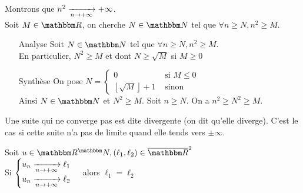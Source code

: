 \begin{exm}
	Montrons que  $n^2 \xrightarrow[n \rightarrow +\infty]{} +\infty$.\\
	Soit $M \in \R$, on cherche $N \in \N$ tel que  $\forall n \ge  N, n^2 \ge M$.\\
	\begin{itemize}
		\item [Analyse] Soit $N \in \N$ tel que $\forall n \ge  N, n^2\ge M$.\\
			En particulier, $N^2\ge M$ et dont $N \ge  \sqrt{M} $ si $M \ge 0$
			\\
		\item[Synthèse]
			On pose $N = \begin{cases}
				0 &\text{ si } M \le 0\\
				\left\lfloor \sqrt{M} \right\rfloor +1 &\text{ sinon }
			\end{cases}$\\

			Ainsi $N \in \N$ et $N^2 \ge  M$. Soit $n \ge N$. On a $n^2 \ge N ^2 \ge  M$.
	\end{itemize}
\end{exm}

\begin{defn}
	Une suite qui ne converge pas est dite divergente (on dit qu'elle diverge). C'est le cas si cette suite n'a pas de limite quand elle tends vers $\pm \infty$.
\end{defn}

\begin{thm}
	Soit $u \in \R^\N, (\ell_1, \ell_2) \in \overline{\R}^2$\\
	Si $\begin{cases}
		u_n \xrightarrow[n \rightarrow +\infty]{} \ell_1\\
		u_n \xrightarrow[n \rightarrow +\infty]{} \ell_2\\
	\end{cases}$ alors $\ell_1 = \ell_2$
\end{thm}

